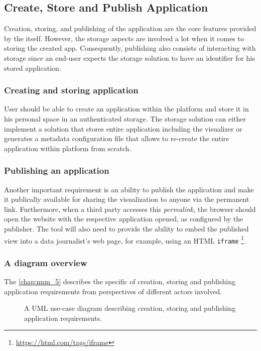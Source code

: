 \subsection{Create, Store and Publish Application}

Creation, storing, and publishing of the application are the core features provided by the \lpa{} itself. However, the storage aspects are involved a lot when it comes to storing the created app. Consequently, publishing also consists of interacting with storage since an end-user expects the storage solution to have an identifier for his stored application.

\subsubsection{Creating and storing application}

User should be able to create an application within the \lpa{} platform and store it in his personal space in an authenticated storage. The storage solution can either implement a solution that stores entire application including the visualizer or generates a metadata configuration file that allows to re-create the entire application within \lpa{} platform from scratch.

\subsubsection{Publishing an application}

Another important requirement is an ability to publish the application and make it publically available for sharing the visualization to anyone via the permanent link. Furthermore, when a third party accesses this \textit{permalink}, the browser should open the \lpa{} website with the respective application opened, as configured by the publisher. The tool will also need to provide the ability to embed the published view into a data journalist's web page, for example, using an HTML \texttt{iframe} \footnote{\url{https://html.com/tags/iframe}}. 

\subsubsection{A diagram overview}

The \autoref{chap:num_5} describes the specific of creation, storing and publishing application requirements from perspectives of different actors involved. 

\begin{figure}[h]
\centering
{}
\caption{A UML use-case diagram describing creation, storing and publishing application requirements.}
\label{fig:lpa_creating_apps_use_case}
\end{figure}

